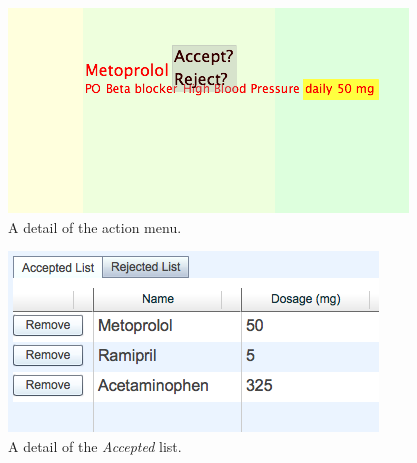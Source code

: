 \documentclass{chi2009}
\begin{document}
\begin{figure}[t]
\begin{center}
\includegraphics[width=1\linewidth]{img/menu.png}
\end{center}
   \caption{A detail of the action menu.}
   \label{fig:menu}
\end{figure}

\begin{figure}[t]
\begin{center}
\includegraphics[width=1\linewidth]{img/acceptlist2.png}
\end{center}
   \caption{A detail of the \textit{Accepted} list.}
   \label{fig:acceptlist}
\end{figure}
\end{document}
